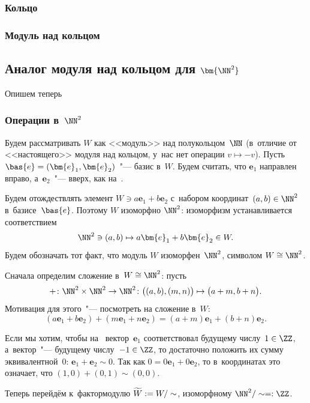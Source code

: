 \subsubsection{Кольцо}

\subsubsection{Модуль над кольцом}

\subsection[Аналог модуля над кольцом для $\NN^2$]{Аналог модуля над кольцом для $\bm{\NN^2}$}

Опишем теперь

\subsubsection{Операции в~$\NN^2$}

Будем рассматривать $W$ как <<модуль>> над полукольцом~$\NN$ (в~отличие от <<настоящего>> модуля над кольцом, у~нас нет операции $v \mapsto -v$). Пусть $\bas{e} = (\bm{e}_1, \bm{e}_2)$~"--- базис в~$W$. Будем считать, что $\bm{e}_1$ направлен вправо, а~$\bm{e}_2$~"--- вверх, как на~.

Будем отождествлять элемент $W \ni a\bm{e}_1 + b\bm{e}_2$ с~набором координат~$(a, b) \in \NN^2$ в~базисе~$\bas{e}$. Поэтому $W$ изоморфно $\NN^2$: изоморфизм устанавливается соответствием
\[
	\NN^2 \ni (a, b) \mapsto a\bm{e}_1 + b \bm{e}_2 \in W
	.
\]
Будем обозначать тот факт, что модуль $W$ изоморфен~$\NN^2$, символом $W \cong \NN^2$.

Сначала определим сложение в~$W \cong \NN^2$: пусть 
\[
	+ \colon \NN^2 \times \NN^2 \to \NN^2
	\colon
	\bigl(
		(a, b),
		(m, n)
	\bigr)
	\mapsto
	\bigl(
		a + m, b + n
	\bigr)
	.
\]
Мотивация для этого~"--- посмотреть на сложение в~$W$:
\[
	(a\bm{e}_1 + b\bm{e}_2) + (m\bm{e}_1 + n\bm{e}_2) =
	(a + m)\bm{e}_1 + (b + n)\bm{e}_2
	.
\]

Если мы хотим, чтобы на~ вектор~$\bm{e}_1$ соответствовал будущему числу~$1 \in \ZZ$, а~вектор~"--- будущему числу~$-1 \in \ZZ$, то достаточно положить их сумму эквивалентной~$0$: $\bm{e}_1 + \bm{e}_2 \sim 0$. Так как $0 = 0\bm{e}_1 + 0\bm{e}_2$, то в~координатах это означает, что $(1, 0) + (0, 1) \sim (0, 0)$.

Теперь перейдём к~фактормодулю $\widetilde{W} := W/\sim$, изоморфному $\NN^2 / \sim =: \ZZ$.

